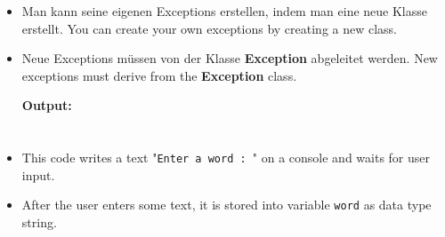 \documentclass[12pt,c, german, aspectratio=169]{beamer} %
\begin{document}
      \begin{frame}{}
        \begin{itemize}
          \item \trans
          {Man kann seine eigenen Exceptions erstellen, indem man eine neue Klasse erstellt.}
          {You can create your own exceptions by creating a new class.}
          \item \trans
          {Neue Exceptions müssen von der Klasse \textbf{Exception} abgeleitet werden.}
          {New exceptions must derive from the \textbf{Exception} class.}
           \\
          \vspace{0.3cm}
          {\footnotesize \textbf{Output:}}
           \\
            \vspace{0.1cm}
        \end{itemize}
      \end{frame}



\section{}
\sectionframe{}

\begin{frame}[fragile]{}
\begin{itemize}
    \item This code writes a text "\texttt{Enter a word : }" on a console and waits for user input.
    \item After the user enters some text, it is stored into variable \texttt{word} as data type string.
\end{itemize}

\end{frame}
\end{document}
